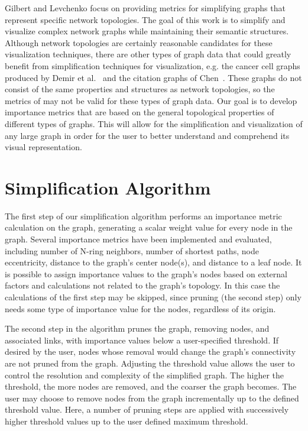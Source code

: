 Gilbert and Levchenko \cite{Gilbert-Levchenko04} focus on providing metrics for simplifying graphs that represent specific network topologies.  The goal of this work is to simplify and visualize complex network graphs while maintaining their semantic structures.  Although network topologies are certainly reasonable candidates for these visualization techniques, there are other types of graph data that could greatly benefit from simplification techniques for visualization, e.g. the cancer cell graphs produced by Demir et al.~\cite{DemGulYen05} and the citation graphs of Chen~\cite{Chen06}.  These graphs do not consist of the same properties and structures as network topologies, so the metrics of \cite{Gilbert-Levchenko04} may not be valid for these types of graph data.  Our goal is to develop importance metrics that are based on the general topological properties of different types of graphs.  This will allow for the simplification and visualization of any large graph in order for the user to better understand and comprehend its visual representation.

\section{Simplification Algorithm}
\label{sect:SimpAlg}

The first step of our simplification algorithm performs an importance metric calculation on the graph, generating a scalar weight value for every node in the graph.  Several importance metrics have been implemented and evaluated, including number of N-ring neighbors, number of shortest paths, node eccentricity, distance to the graph's center node(s), and distance to a leaf node.  It is possible to assign importance values to the graph's nodes based on external factors and calculations not related to the graph's topology.  In this case the calculations of the first step may be skipped, since pruning (the second step) only needs some type of importance value for the nodes, regardless of its origin.

The second step in the algorithm prunes the graph, removing nodes, and associated links, with importance values below a user-specified threshold.  If desired by the user, nodes whose removal would change the graph's connectivity are not pruned from the graph.  Adjusting the threshold value allows the user to control the resolution and complexity of the simplified graph.  The higher the threshold, the more nodes are removed, and the coarser the graph becomes.  The user may choose to remove nodes from the graph incrementally up to the defined threshold value.  Here, a number of pruning steps are applied with successively higher threshold values up to the user defined maximum threshold.



